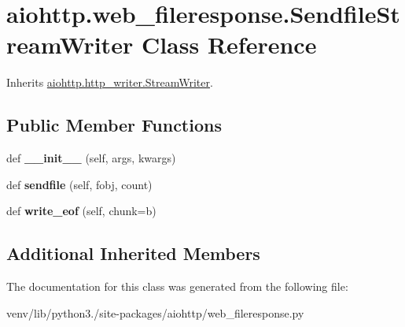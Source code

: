 \hypertarget{classaiohttp_1_1web__fileresponse_1_1_sendfile_stream_writer}{}\section{aiohttp.\+web\+\_\+fileresponse.\+Sendfile\+Stream\+Writer Class Reference}
\label{classaiohttp_1_1web__fileresponse_1_1_sendfile_stream_writer}


Inherits \hyperlink{classaiohttp_1_1http__writer_1_1_stream_writer}{aiohttp.\+http\+\_\+writer.\+Stream\+Writer}.

\subsection*{Public Member Functions}
\begin{DoxyCompactItemize}
\item 
\mbox{\label{classaiohttp_1_1web__fileresponse_1_1_sendfile_stream_writer_a829933facd084b985b285ae132ea3897}} 
def {\bfseries \+\_\+\+\_\+init\+\_\+\+\_\+} (self, args, kwargs)
\item 
\mbox{\label{classaiohttp_1_1web__fileresponse_1_1_sendfile_stream_writer_acd42e210b522131a243edadb8541cbdc}} 
def {\bfseries sendfile} (self, fobj, count)
\item 
\mbox{\label{classaiohttp_1_1web__fileresponse_1_1_sendfile_stream_writer_a756725589915e8a33801bbd61a73e5fe}} 
def {\bfseries write\+\_\+eof} (self, chunk=b\textquotesingle{}\textquotesingle{})
\end{DoxyCompactItemize}
\subsection*{Additional Inherited Members}


The documentation for this class was generated from the following file\+:\begin{DoxyCompactItemize}
\item 
venv/lib/python3./site-\/packages/aiohttp/web\+\_\+fileresponse.\+py\end{DoxyCompactItemize}
